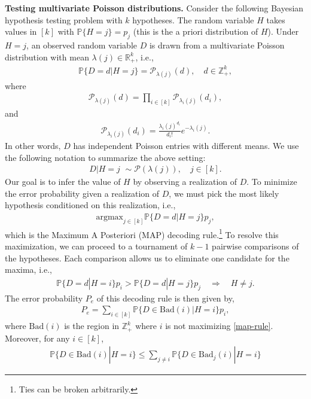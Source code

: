 \documentclass[11pt]{article}
\newcommand{\argmax}{\mathrm{argmax}}
\newcommand{\mR}{\mathbb{R}}
\newcommand{\mZ}{\mathbb{Z}}
\newcommand{\pp}{\mathbb{P}}
\newcommand{\1}{\mathbb{1}}
\begin{document}
{\bf Testing multivariate Poisson distributions.} Consider the following Bayesian hypothesis testing problem with $k$ hypotheses.
The random variable $H$ takes values in $[k]$ with $\pp\{H=j\}=p_j$ (this is the a priori distribution of $H$). Under $H=j$, an observed random variable $D$ is drawn from a multivariate Poisson distribution with mean $\lambda(j) \in \mR_+^k$, i.e.,  
\begin{align}
\pp\{D=d|H=j\}=\mathcal{P}_{\lambda(j)}(d), \quad d \in \mZ_+^k,
\end{align}
where 
\begin{align}
\mathcal{P}_{\lambda(j)}(d) = \prod_{i \in [k]} \mathcal{P}_{\lambda_i(j)}(d_i), 
\end{align}
and
\begin{align}
\mathcal{P}_{\lambda_i(j)}(d_i) = \frac{\lambda_i(j)^{d_i}}{d_i!} e^{- \lambda_i(j)}.
\end{align} 
In other words, $D$ has independent Poisson entries with different means. We use the following notation to summarize the above setting:
\begin{align}
D|H=j \,\, \sim \mathcal{P}(\lambda(j)), \quad j \in [k].
\end{align}
Our goal is to infer the value of $H$ by observing a realization of $D$. To minimize the error probability given a realization of $D$, we must pick the most likely hypothesis conditioned on this realization, i.e., 
\begin{align}
\argmax_{j \in [k]} \pp \{D=d | H=j\} p_j, \label{map-rule}
\end{align}
which is the Maximum A Posteriori (MAP) decoding rule.\footnote{Ties can be broken arbitrarily.} To resolve this maximization, we can proceed to a tournament of $k-1$ pairwise comparisons of the hypotheses. Each comparison allows us to eliminate one candidate for the maxima, i.e., 
\begin{align}
\pp \{D=d | H=i\} p_i >  \pp \{D=d | H=j\} p_j \quad \Rightarrow \quad H \neq  j. 
\end{align}
The error probability $P_e$ of this decoding rule is then given by,
\begin{align}
P_e = \sum_{i \in [k]} \pp\{ D \in \text{Bad}(i)  | H=i\} p_i, \label{error1}
\end{align}
where $\text{Bad}(i)$ is the region in $\mZ_+^k$ where $i$ is not maximizing \eqref{map-rule}. Moreover, for any $i \in [k]$, 
\begin{align}
\pp\{ D \in \text{Bad}(i) | H=i\} \leq \sum_{j \neq i} \pp\{ D \in \text{Bad}_j(i) |H=i\} \label{pair1}
\end{align}
\end{document}
